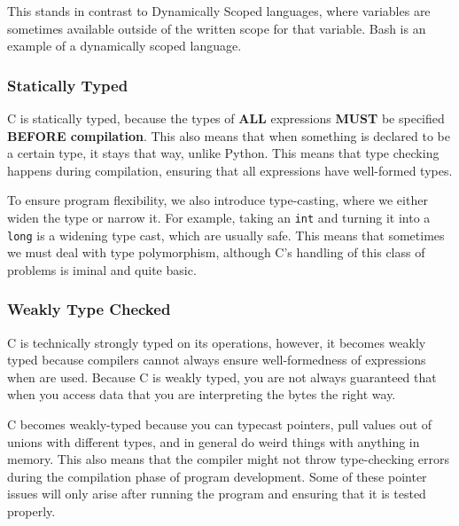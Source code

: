 This stands in contrast to Dynamically Scoped languages, where variables are sometimes available outside of the written scope for that variable.
Bash is an example of a dynamically scoped language.

\subsubsection{Statically Typed}\label{subsubsec:Statically_Typed}
C is statically typed, because the types of \textbf{ALL} expressions \textbf{MUST} be specified \textbf{BEFORE compilation}.
This also means that when something is declared to be a certain type, it stays that way, unlike Python.
This means that type checking happens during compilation, ensuring that all expressions have well-formed types.

To ensure program flexibility, we also introduce type-casting, where we either widen the type or narrow it.
For example, taking an \texttt{int} and turning it into a \texttt{long} is a widening type cast, which are usually safe.
This means that sometimes we must deal with type polymorphism, although C's handling of this class of problems is iminal and quite basic.

\subsubsection{Weakly Type Checked}\label{subsubsec:Weakly_Type_Checked}
C is technically strongly typed on its operations, however, it becomes weakly typed because compilers cannot always ensure well-formedness of expressions when  are used.
Because C is weakly typed, you are not always guaranteed that when you access data that you are interpreting the bytes the right way.

C becomes weakly-typed because you can typecast pointers, pull values out of unions with different types, and in general do weird things with anything in memory.
This also means that the compiler might not throw type-checking errors during the compilation phase of program development.
Some of these pointer issues will only arise after running the program and ensuring that it is tested properly.


